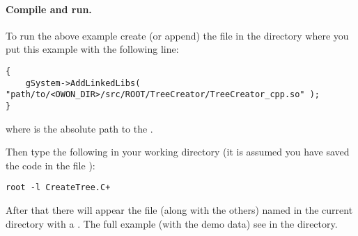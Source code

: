 \paragraph*{Compile and run.} To run the above example create (or append) the  file in the directory
where you put this example with the following line:
\begin{lstlisting}
{
    gSystem->AddLinkedLibs( "path/to/<OWON_DIR>/src/ROOT/TreeCreator/TreeCreator_cpp.so" );
}
\end{lstlisting}
where  is the absolute path to the .

Then type the following in your working directory (it is assumed you have saved the code in the file ):
\begin{lstlisting}
root -l CreateTree.C+
\end{lstlisting}
After that there will appear the file (along with the others) named  in the current directory with a . The full example (with the demo data)
see in the  directory.
